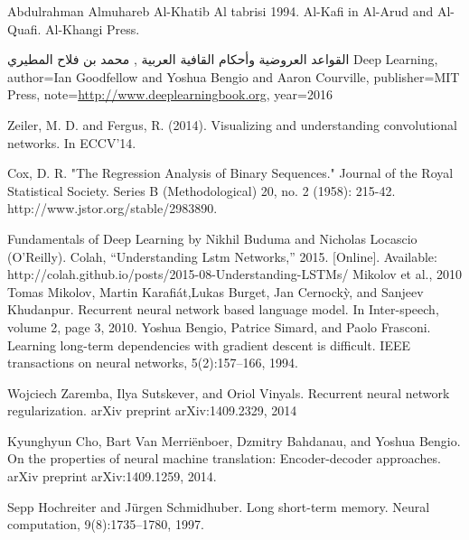 \makeatletter
\renewcommand{\ps@plain}{%
\renewcommand\@oddhead{\hfil\normalfont\textrm{\thepage}}%
\renewcommand\@evenhead{}%
\renewcommand\@oddfoot{}%
\renewcommand\@evenfoot{}%
}
\makeatother
\pagestyle{myheadings}
\renewcommand\bibname{\uppercase{References}}
\begin{thebibliography}{999}
Abdulrahman Almuhareb
 Al-Khatib Al tabrisi 1994. Al-Kafi in Al-Arud and Al-Quafi. Al-Khangi Press.
 

    
 القواعد العروضية وأحكام القافية العربية , محمد بن فلاح المطيري
 Deep Learning,
    author={Ian Goodfellow and Yoshua Bengio and Aaron Courville},
    publisher={MIT Press},
    note={\url{http://www.deeplearningbook.org}},
    year={2016}

     Zeiler, M. D. and Fergus, R. (2014). Visualizing and understanding convolutional networks. In ECCV’14.

       Cox, D. R. "The Regression Analysis of Binary Sequences." Journal of the Royal Statistical Society. Series B (Methodological) 20, no. 2 (1958): 215-42. http://www.jstor.org/stable/2983890.

Fundamentals of Deep Learning by Nikhil Buduma and Nicholas Locascio (O’Reilly).
 Colah, “Understanding Lstm Networks,” 2015. [Online]. Available: http://colah.github.io/posts/2015-08-Understanding-LSTMs/
 Mikolov et al., 2010 Tomas Mikolov, Martin Karafiát,Lukas Burget, Jan Cernockỳ, and Sanjeev Khudanpur. Recurrent neural network based language model. In Inter-speech, volume 2, page 3, 2010.
 Yoshua Bengio, Patrice Simard, and Paolo Frasconi. Learning long-term dependencies with gradient descent is difficult. IEEE transactions on neural networks, 5(2):157–166, 1994.

 Wojciech Zaremba, Ilya Sutskever, and Oriol Vinyals. Recurrent neural network regularization. arXiv preprint arXiv:1409.2329, 2014

 Kyunghyun Cho, Bart Van Merriënboer, Dzmitry Bahdanau, and Yoshua Bengio. On the properties of neural machine translation: Encoder-decoder approaches. arXiv preprint arXiv:1409.1259, 2014.

 Sepp Hochreiter and Jürgen Schmidhuber. Long short-term memory. Neural computation, 9(8):1735–1780, 1997.


\end{thebibliography}
